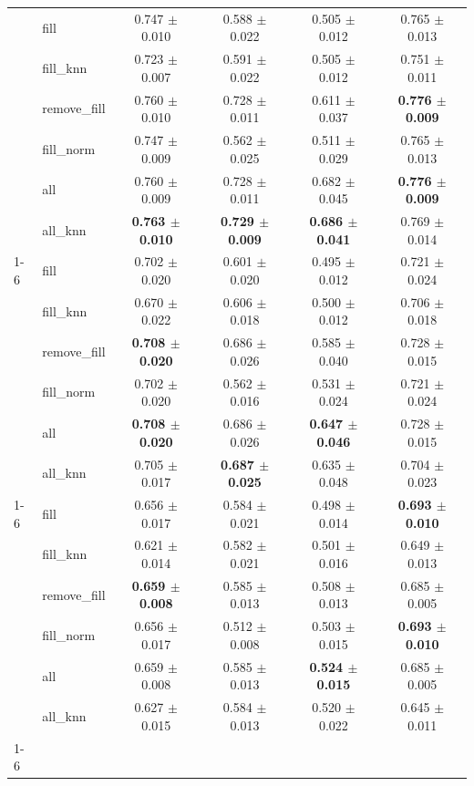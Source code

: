 \begin{table}[htbp]
\begin{tabular}{llcccc}
{{\cline{1-6}
\multirow[t]{7}{*}{30%
 & fill & 0.747 $\pm$ 0.010 & 0.588 $\pm$ 0.022 & 0.505 $\pm$ 0.012 & 0.765 $\pm$ 0.013 \\
 & fill_knn & 0.723 $\pm$ 0.007 & 0.591 $\pm$ 0.022 & 0.505 $\pm$ 0.012 & 0.751 $\pm$ 0.011 \\
 & remove_fill & 0.760 $\pm$ 0.010 & 0.728 $\pm$ 0.011 & 0.611 $\pm$ 0.037 & \textbf{0.776 $\pm$ 0.009} \\
 & fill_norm & 0.747 $\pm$ 0.009 & 0.562 $\pm$ 0.025 & 0.511 $\pm$ 0.029 & 0.765 $\pm$ 0.013 \\
 & all & 0.760 $\pm$ 0.009 & 0.728 $\pm$ 0.011 & 0.682 $\pm$ 0.045 & \textbf{0.776 $\pm$ 0.009} \\
 & all_knn & \textbf{0.763 $\pm$ 0.010} & \textbf{0.729 $\pm$ 0.009} & \textbf{0.686 $\pm$ 0.041} & 0.769 $\pm$ 0.014 \\
\cline{1-6}
\multirow[t]{7}{*}{40%
 & fill & 0.702 $\pm$ 0.020 & 0.601 $\pm$ 0.020 & 0.495 $\pm$ 0.012 & 0.721 $\pm$ 0.024 \\
 & fill_knn & 0.670 $\pm$ 0.022 & 0.606 $\pm$ 0.018 & 0.500 $\pm$ 0.012 & 0.706 $\pm$ 0.018 \\
 & remove_fill & \textbf{0.708 $\pm$ 0.020} & 0.686 $\pm$ 0.026 & 0.585 $\pm$ 0.040 & 0.728 $\pm$ 0.015 \\
 & fill_norm & 0.702 $\pm$ 0.020 & 0.562 $\pm$ 0.016 & 0.531 $\pm$ 0.024 & 0.721 $\pm$ 0.024 \\
 & all & \textbf{0.708 $\pm$ 0.020} & 0.686 $\pm$ 0.026 & \textbf{0.647 $\pm$ 0.046} & 0.728 $\pm$ 0.015 \\
 & all_knn & 0.705 $\pm$ 0.017 & \textbf{0.687 $\pm$ 0.025} & 0.635 $\pm$ 0.048 & 0.704 $\pm$ 0.023 \\
\cline{1-6}
\multirow[t]{7}{*}{50%
 & fill & 0.656 $\pm$ 0.017 & 0.584 $\pm$ 0.021 & 0.498 $\pm$ 0.014 & \textbf{0.693 $\pm$ 0.010} \\
 & fill_knn & 0.621 $\pm$ 0.014 & 0.582 $\pm$ 0.021 & 0.501 $\pm$ 0.016 & 0.649 $\pm$ 0.013 \\
 & remove_fill & \textbf{0.659 $\pm$ 0.008} & 0.585 $\pm$ 0.013 & 0.508 $\pm$ 0.013 & 0.685 $\pm$ 0.005 \\
 & fill_norm & 0.656 $\pm$ 0.017 & 0.512 $\pm$ 0.008 & 0.503 $\pm$ 0.015 & \textbf{0.693 $\pm$ 0.010} \\
 & all & 0.659 $\pm$ 0.008 & 0.585 $\pm$ 0.013 & \textbf{0.524 $\pm$ 0.015} & 0.685 $\pm$ 0.005 \\
 & all_knn & 0.627 $\pm$ 0.015 & 0.584 $\pm$ 0.013 & 0.520 $\pm$ 0.022 & 0.645 $\pm$ 0.011 \\
\cline{1-6}
\bottomrule
\end{tabular}
\end{table}
